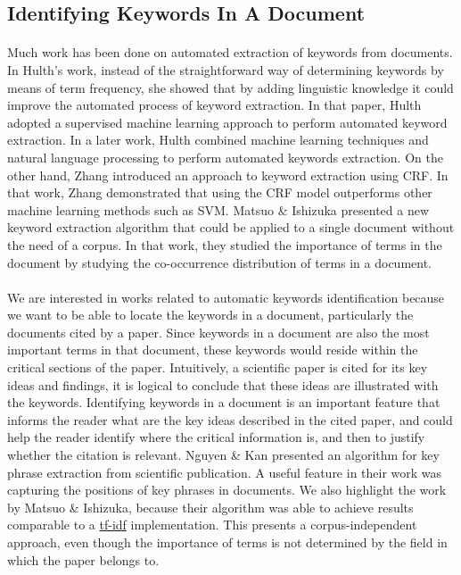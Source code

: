 \documentclass[12 pt]{article}
\begin{document}
\subsection{Identifying Keywords In A Document}
\paragraph{}
Much work has been done on automated extraction of keywords from documents. In Hulth\cite{keywordextraction_ml}'s work, instead of the straightforward way of determining keywords by means of term frequency, she showed that by adding linguistic knowledge it could improve the automated process of keyword extraction. In that paper, Hulth adopted a supervised machine learning approach to perform automated keyword extraction. In a later work, Hulth\cite{keywordextraction_mlnlp} combined machine learning techniques and natural language processing to perform automated keywords extraction. On the other hand, Zhang\cite{keywordextraction_crf} introduced an approach to keyword extraction using CRF. In that work, Zhang demonstrated that using the CRF model outperforms other machine learning methods such as SVM. Matsuo \& Ishizuka\cite{keywordextraction_corpusfree} presented a new keyword extraction algorithm that could be applied to a single document without the need of a corpus. In that work, they studied the importance of terms in the document by studying the co-occurrence distribution of terms in a document.

\paragraph{}
We are interested in works related to automatic keywords identification because we want to be able to locate the keywords in a document, particularly the documents cited by a paper. Since keywords in a document are also the most important terms in that document, these keywords would reside within the critical sections of the paper. Intuitively, a scientific paper is cited for its key ideas and findings, it is logical to conclude that these ideas are illustrated with the keywords. Identifying keywords in a document is an important feature that informs the reader what are the key ideas described in the cited paper, and could help the reader identify where the critical information is, and then to justify whether the citation is relevant. Nguyen \& Kan\cite{keyphrase} presented an algorithm for key phrase extraction from scientific publication. A useful feature in their work was capturing the positions of key phrases in documents. We also highlight the work by Matsuo \& Ishizuka, because their algorithm was able to achieve results comparable to a \url{tf-idf}\cite{irtextbook} implementation. This presents a corpus-independent approach, even though the importance of terms is not determined by the field in which the paper belongs to.
\end{document}
